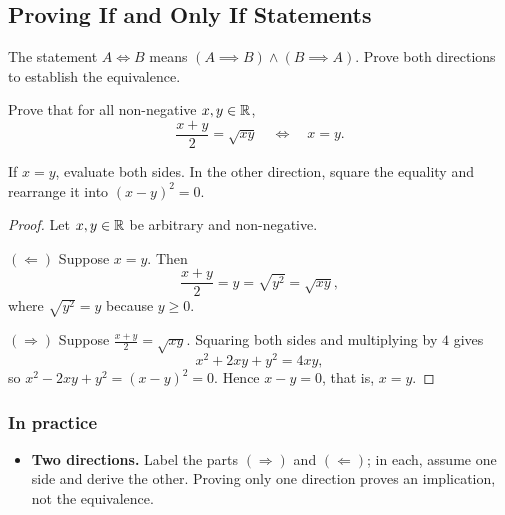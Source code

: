\subsection{Proving If and Only If Statements}
The statement $A\iff B$ means $(A\implies B)\wedge(B\implies A)$.
Prove both directions to establish the equivalence.

\begin{example}
    Prove that for all non-negative $x, y \in \mathbb{R}$,
    \begin{equation*}
        \frac{x+y}{2}=\sqrt{xy}\quad\iff\quad x=y.
    \end{equation*}
\end{example}
\begin{remark}
    If $x=y$, evaluate both sides. In the other direction, square the equality
    and rearrange it into $(x-y)^2=0$.
\end{remark}
\begin{proof}
    Let $x,y\in\mathbb{R}$ be arbitrary and non-negative.

    $(\Leftarrow)$ Suppose $x=y$. Then
    \begin{equation*}
        \frac{x+y}{2}=y=\sqrt{y^2}=\sqrt{xy},
    \end{equation*}
    where $\sqrt{y^2}=y$ because $y\geq 0$.

    $(\Rightarrow)$ Suppose $\frac{x+y}{2}=\sqrt{xy}$. Squaring both sides and
    multiplying by $4$ gives
    \begin{equation*}
        x^2+2xy+y^2=4xy,
    \end{equation*}
    so $x^2-2xy+y^2=(x-y)^2=0$. Hence $x-y=0$, that is, $x=y$.
\end{proof}

\subsubsection*{In practice}
\begin{itemize}
    \item \textbf{Two directions.} Label the parts $(\Rightarrow)$ and
    $(\Leftarrow)$; in each, assume one side and derive the other. Proving
    only one direction proves an implication, not the equivalence.
\end{itemize}
